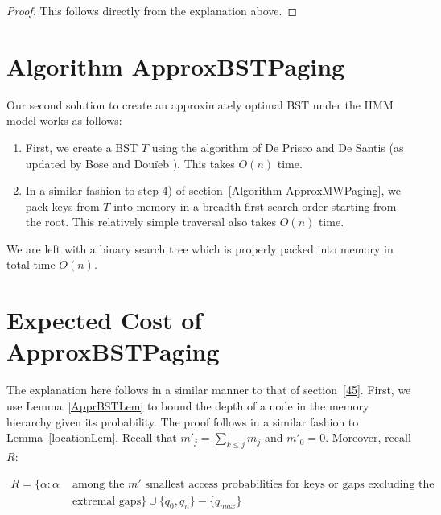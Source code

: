 \documentclass[letterpaper,12pt,titlepage,oneside,final]{book}
\theoremstyle{plain}
\begin{document}
\begin{proof}
This follows directly from the explanation above.
\end{proof}

\section{Algorithm ApproxBSTPaging}\label{Algorithm ApproxBSTPaging}

Our second solution to create an approximately optimal BST under the HMM model works as follows: \\

\begin{enumerate}
\item First, we create a BST $T$ using the algorithm of De Prisco and De Santis \cite{de1993binary} (as updated by Bose and Dou\"{i}eb \cite{bose2009efficient}). This takes $O(n)$ time. \\

\item In a similar fashion to step 4) of section~\ref{Algorithm ApproxMWPaging}, we pack keys from $T$ into memory in a breadth-first search order starting from the root. This relatively simple traversal also takes $O(n)$ time.
\end{enumerate}

We are left with a binary search tree which is properly packed into memory in total time $O(n)$.


\section{Expected Cost of ApproxBSTPaging}\label{48}

The explanation here follows in a similar manner to that of section~\ref{45}. First, we use Lemma~\ref{ApprBSTLem} to bound the depth of a node in the memory hierarchy given its probability. The proof follows in a similar fashion to Lemma~\ref{locationLem}. Recall that $m'_j = \sum_{k \leq j} m_j$ and $m'_0 = 0$. Moreover, recall $R$:

\begin{align*}
R = \{\alpha : \alpha &\text{ among the }m' \text{ smallest access probabilities for keys or gaps excluding the} \\
&\text{ extremal gaps} \} \cup \{q_0, q_n\} - \{q_{max}\}
\end{align*}
\end{document}
